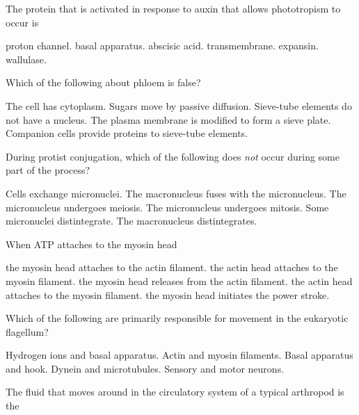 
\question
The protein that is activated in response to auxin that allows phototropism to occur is

\begin{choices}
\choice proton channel. 
\choice basal apparatus. 
\choice abscisic acid. 
\choice transmembrane. 
\correctchoice expansin. 
\choice wallulase. 
\end{choices}

\question
Which of the following about phloem is false?

\begin{choices}
\choice The cell has cytoplasm. 
\choice Sugars move by passive diffusion. 
\choice Sieve-tube elements do not have a nucleus. 
\correctchoice The plasma membrane is modified to form a sieve plate. 
\choice Companion cells provide proteins to sieve-tube elements. 
\end{choices}

\question
During protist conjugation, which of the following does \emph{not} occur during some part of the process?

\begin{choices}
\choice Cells exchange micronuclei.  
\correctchoice The macronucleus fuses with the micronucleus. 
\choice The micronucleus undergoes meiosis. 
\choice The micronucleus undergoes mitosis. 
\choice Some micronuclei distintegrate. 
\choice The macronucleus distintegrates. 
\end{choices}

\question
When ATP attaches to the myosin head

\begin{choices}
\choice the myosin head attaches to the actin filament.  
\choice the actin head attaches to the myosin filament. 
\correctchoice the myosin head releases from the actin filament. 
\choice the actin head attaches to the myosin filament. 
\choice the myosin head initiates the power stroke. 
\end{choices}

\question
Which of the following are primarily responsible for movement in the eukaryotic flagellum?

\begin{choices}
\choice Hydrogen ions and basal apparatus. 
\choice Actin and myosin filaments.  
\choice Basal apparatus and hook. 
\correctchoice Dynein and microtubules. 
\choice Sensory and motor neurons. 
\end{choices}

\newpage

\question
The fluid that moves around in the circulatory system of a typical arthropod is the

